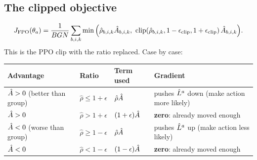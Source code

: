 \subsection{The clipped objective }
\begin{equation}
J_{\mathrm{FPO}}(\tha)=\frac1{BGN}\sum_{b,i,k}\min\Big(\hat\rho_{b,i,k}\Ah_{b,i,k},\ \clip(\hat\rho_{b,i,k},1-\epsilon_{\mathrm{clip}},1+\epsilon_{\mathrm{clip}})\,\Ah_{b,i,k}\Big).
\label{loop:eq:fpo}
\end{equation}
This is the PPO clip with the ratio replaced. Case by case:
\begin{center}
\small
\begin{tabular}{@{}llll@{}}
\toprule
Advantage & Ratio & Term used & Gradient\\
\midrule
$\hat A>0$ (better than group) & $\hat\rho\le1+\epsilon$ & $\hat\rho\hat A$ & pushes $\hat L^{a}$ down (make action more likely)\\
$\hat A>0$ & $\hat\rho>1+\epsilon$ & $(1+\epsilon)\hat A$ & \textbf{zero}: already moved enough\\
$\hat A<0$ (worse than group) & $\hat\rho\ge1-\epsilon$ & $\hat\rho\hat A$ & pushes $\hat L^{a}$ up (make action less likely)\\
$\hat A<0$ & $\hat\rho<1-\epsilon$ & $(1-\epsilon)\hat A$ & \textbf{zero}: already moved enough\\
\bottomrule
\end{tabular}
\end{center}

